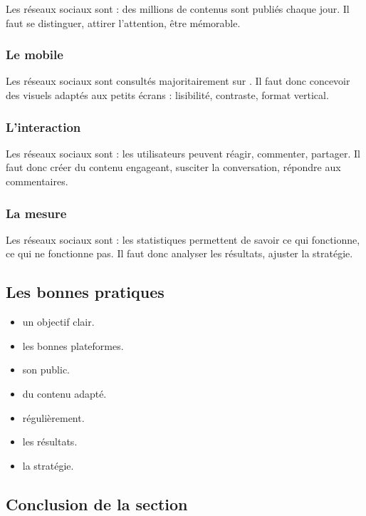 Les réseaux sociaux sont  : des millions de contenus sont publiés chaque jour. Il faut se distinguer, attirer l'attention, être mémorable.

\subsubsection{Le mobile}

Les réseaux sociaux sont consultés majoritairement sur . Il faut donc concevoir des visuels adaptés aux petits écrans : lisibilité, contraste, format vertical.

\subsubsection{L'interaction}

Les réseaux sociaux sont  : les utilisateurs peuvent réagir, commenter, partager. Il faut donc créer du contenu engageant, susciter la conversation, répondre aux commentaires.

\subsubsection{La mesure}

Les réseaux sociaux sont  : les statistiques permettent de savoir ce qui fonctionne, ce qui ne fonctionne pas. Il faut donc analyser les résultats, ajuster la stratégie.

\subsection{Les bonnes pratiques}

\begin{itemize}
    \item {} un objectif clair.
    \item {} les bonnes plateformes.
    \item {} son public.
    \item {} du contenu adapté.
    \item {} régulièrement.
    \item {} les résultats.
    \item {} la stratégie.
\end{itemize}

\subsection*{Conclusion de la section}

